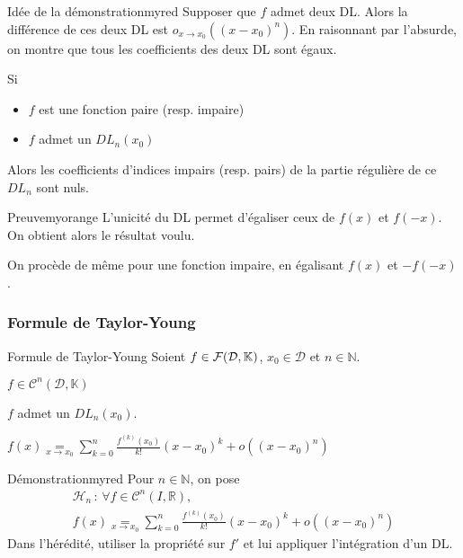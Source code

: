     \begin{demo}{Idée de la démonstration}{myred}
        Supposer que $f$ admet deux DL. Alors la différence de ces deux DL est $o_{x \rightarrow x_0} ((x-x_0)^n)$. En raisonnant par l’absurde, on montre que tous les coefficients des deux DL sont égaux.
    \end{demo}

    \begin{coro}{}{}
        Si 
        \begin{itemize}
            \item $f$ est une fonction paire (resp. impaire)
            \item $f$ admet un $DL_n(x_0)$ 
        \end{itemize}
        Alors les coefficients d’indices impairs (resp. pairs) de la partie régulière de ce $DL_n$ sont nuls.
    \end{coro}

    \begin{demo}{Preuve}{myorange}
        L’unicité du DL permet d’égaliser ceux de $f(x)$ et $f(-x)$. On obtient alors le résultat voulu.
    
        On procède de même pour une fonction impaire, en égalisant $f(x)$ et $-f(-x)$.
    \end{demo}

    \subsubsection{Formule de Taylor-Young}

    \begin{theo}{Formule de Taylor-Young}{}
        Soient $f \in \mathcal{F}(\mathcal{D},\mathbb{K})$, $x_0 \in \mathcal{D}$ et $n \in \mathbb{N}$.

        \begin{suppose}
            \item $f \in \mathcal{C}^n(\mathcal{D}, \mathbb{K})$
        \end{suppose}
        \begin{alors}
            \item $f$ admet un $DL_n(x_0)$.
            \item $f(x) \underset{x \rightarrow x_0}{=} \sum\limits_{k=0}^{n} \frac{f^{(k)}(x_0)}{k!} (x-x_0)^k +o\left((x-x_0)^n\right)$ 
        \end{alors}
    \end{theo}

    \begin{demo}{Démonstration}{myred}
        Pour $n \in \mathbb{N}$, on pose 
        \begin{multline*}
            \mathcal{H}_n \, : \, \forall f \in \mathcal{C}^n(I,\mathbb{R}), \\
            f(x) \underset{x \rightarrow x_0}{=} \sum\limits_{k=0}^{n} \frac{f^{(k)}(x_0)}{k!} (x-x_0)^k +o\left((x-x_0)^n\right)
        \end{multline*}
        Dans l’hérédité, utiliser la propriété sur $f'$ et lui appliquer l’intégration d’un DL.
    \end{demo}


